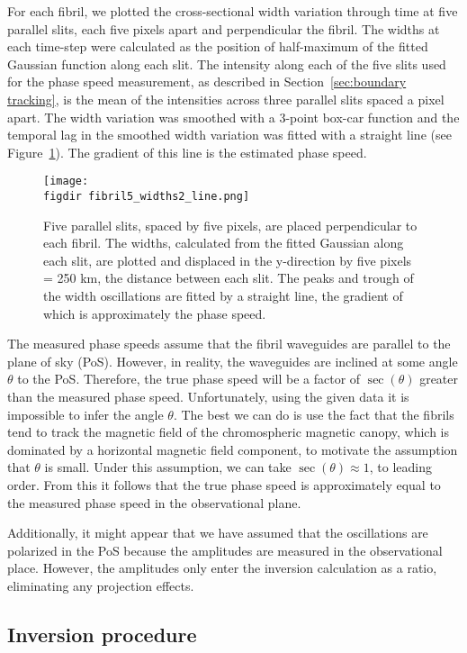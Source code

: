 \documentclass[12pt]{../style-files/ociamthesis}
\newcommand{\figdir}{../main/figures/chpt-5/} %
\begin{document}
For each fibril, we plotted the cross-sectional width variation through time at five parallel slits, each five pixels apart and perpendicular the fibril. The widths at each time-step were calculated as the position of half-maximum of the fitted Gaussian function along each slit. The intensity along each of the five slits used for the phase speed measurement, as described in Section~\ref{sec:boundary tracking}, is the mean of the intensities across three parallel slits spaced a pixel apart. The width variation was smoothed with a 3-point box-car function and the temporal lag in the smoothed width variation was fitted with a straight line (see Figure~\ref{fig: fibril5_width}). The gradient of this line is the estimated phase speed.

\begin{figure}
	\centering
	\texttt{[image: \\figdir fibril5\_widths2\_line.png]}
	\caption{Five parallel slits, spaced by five pixels, are placed perpendicular to each fibril. The widths, calculated from the fitted Gaussian along each slit, are plotted and displaced in the y-direction by five pixels = 250 km, the distance between each slit. The peaks and trough of the width oscillations are fitted by a straight line, the gradient of which is approximately the phase speed.}
	\label{fig: fibril5_width}
\end{figure}

The measured phase speeds assume that the fibril waveguides are parallel to the plane of sky (PoS). However, in reality, the waveguides are inclined at some angle $\theta$ to the PoS. Therefore, the true phase speed will be a factor of $\sec(\theta)$ greater than the measured phase speed. Unfortunately, using the given data it is impossible to infer the angle $\theta$. The best we can do is use the fact that the fibrils tend to track the magnetic field of the chromospheric magnetic canopy, which is dominated by a horizontal magnetic field component, to motivate the assumption that $\theta$ is small. Under this assumption, we can take $\sec(\theta) \approx 1$, to leading order. From this it follows that the true phase speed is approximately equal to the measured phase speed in the observational plane.

Additionally, it might appear that we have assumed that the oscillations are polarized in the PoS because the amplitudes are measured in the observational place. However, the amplitudes only enter the inversion calculation as a ratio, eliminating any projection effects.


\subsection{Inversion procedure}\label{sec:inversion}
\end{document}
